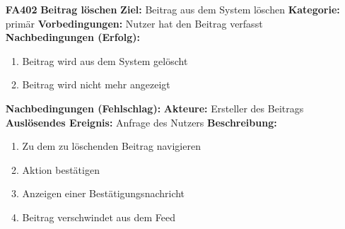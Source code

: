 \documentclass[parskip=full]{scrartcl}
\begin{document}
\begin{itemize}[nosep]
			\item[\textbf{FA402}]\textbf{Beitrag löschen}
			\newline \textbf{Ziel:} Beitrag aus dem System löschen
			\newline \textbf{Kategorie:} primär
			\newline \textbf{Vorbedingungen:} Nutzer hat den Beitrag verfasst
			\newline \textbf{Nachbedingungen (Erfolg):}
			\begin{enumerate}[nosep]
				\item Beitrag wird aus dem System gelöscht
				\item Beitrag wird nicht mehr angezeigt
			\end{enumerate}
			\textbf{Nachbedingungen (Fehlschlag):}
			\newline \textbf{Akteure:} Ersteller des Beitrags
			\newline \textbf{Auslösendes Ereignis:} Anfrage des Nutzers
			\newline \textbf{Beschreibung:}
			\begin{enumerate}[nosep]
				\item Zu dem zu löschenden Beitrag navigieren
				\item Aktion bestätigen
				\item Anzeigen einer Bestätigungsnachricht
				\item Beitrag verschwindet aus dem \gls{Feed}\\
			\end{enumerate}
			

\end{itemize}
\end{document}
